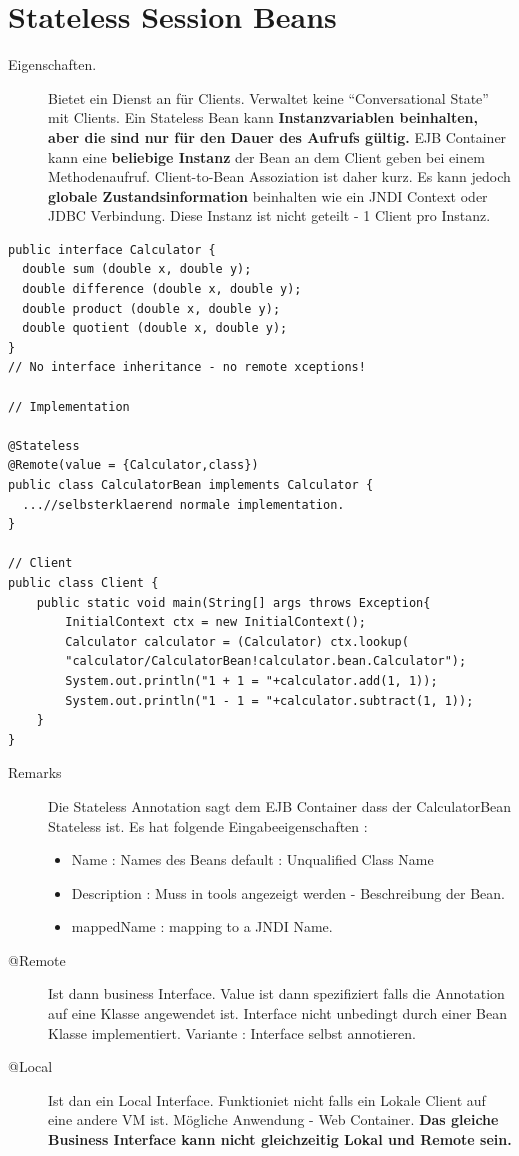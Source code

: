 \documentclass[a4paper,10pt]{scrreprt}
\begin{document}
\section{Stateless Session Beans}
\begin{description}
 \item [Eigenschaften.] Bietet ein Dienst an für Clients. Verwaltet keine ``Conversational State'' mit Clients. Ein Stateless Bean kann \textbf{Instanzvariablen beinhalten, aber die sind nur für den Dauer des Aufrufs gültig.} EJB Container kann eine \textbf{beliebige Instanz} der Bean an dem Client geben bei einem Methodenaufruf. Client-to-Bean Assoziation ist daher kurz. Es kann jedoch \textbf{globale Zustandsinformation} beinhalten wie ein JNDI Context oder JDBC Verbindung. Diese Instanz ist nicht geteilt - 1 Client pro Instanz.
\end{description}
\begin{lstlisting}[caption=Calculator Example Stateless Bean]
public interface Calculator {
  double sum (double x, double y);
  double difference (double x, double y);
  double product (double x, double y);
  double quotient (double x, double y);
}
// No interface inheritance - no remote xceptions!

// Implementation

@Stateless
@Remote(value = {Calculator,class})
public class CalculatorBean implements Calculator {
  ...//selbsterklaerend normale implementation.
}

// Client
public class Client {
	public static void main(String[] args throws Exception{
		InitialContext ctx = new InitialContext();
		Calculator calculator = (Calculator) ctx.lookup(
		"calculator/CalculatorBean!calculator.bean.Calculator");
		System.out.println("1 + 1 = "+calculator.add(1, 1));
		System.out.println("1 - 1 = "+calculator.subtract(1, 1));
	}
}
\end{lstlisting}
\begin{description}
 \item [Remarks] Die Stateless Annotation sagt dem EJB Container dass der CalculatorBean Stateless ist. Es hat folgende Eingabeeigenschaften : 
 \begin{itemize}
  \item Name : Names des Beans default : Unqualified Class Name
  \item Description : Muss in tools angezeigt werden - Beschreibung der Bean.
  \item mappedName : mapping to a JNDI Name. 
 \end{itemize}
 \item[@Remote] Ist dann business Interface. Value ist dann spezifiziert falls die Annotation auf eine Klasse angewendet ist. Interface nicht unbedingt durch einer Bean Klasse implementiert. Variante : Interface selbst annotieren.
 \item[@Local] Ist dan ein Local Interface. Funktioniet nicht falls ein Lokale Client auf eine andere VM ist. Mögliche Anwendung - Web Container. \textbf{Das gleiche Business Interface kann nicht gleichzeitig Lokal und Remote sein.}
\end{description}
\end{document}
